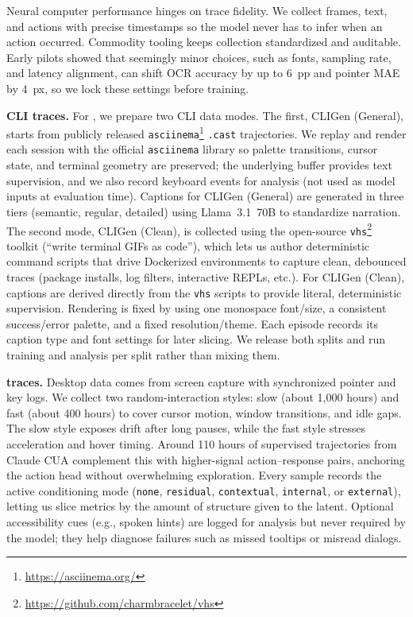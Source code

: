 Neural computer performance hinges on trace fidelity. We collect frames, text, and actions with precise timestamps so the model never has to infer when an action occurred. Commodity tooling keeps collection standardized and auditable. Early pilots showed that seemingly minor choices, such as fonts, sampling rate, and latency alignment, can shift OCR accuracy by up to 6~pp and pointer MAE by 4~px, so we lock these settings before training.

\noindent\textbf{CLI traces.}
For \nccligen{}, we prepare two CLI data modes. The first, CLIGen (General), starts from publicly released \texttt{asciinema}\footnote{\url{https://asciinema.org/}} \texttt{.cast} trajectories. We replay and render each session with the official \texttt{asciinema} library so palette transitions, cursor state, and terminal geometry are preserved; the underlying buffer provides text supervision, and we also record keyboard events for analysis (not used as model inputs at evaluation time). Captions for CLIGen (General) are generated in three tiers (semantic, regular, detailed) using Llama~3.1~70B to standardize narration. The second mode, CLIGen (Clean), is collected using the open-source \texttt{vhs}\footnote{\url{https://github.com/charmbracelet/vhs}} toolkit (``write terminal GIFs as code''), which lets us author deterministic command scripts that drive Dockerized environments to capture clean, debounced traces (package installs, log filters, interactive REPLs, etc.). For CLIGen (Clean), captions are derived directly from the \texttt{vhs} scripts to provide literal, deterministic supervision. Rendering is fixed by using one monospace font/size, a consistent success/error palette, and a fixed resolution/theme. Each episode records its caption type and font settings for later slicing. We release both splits and run training and analysis per split rather than mixing them.

\noindent\textbf{\ncguiworld{} traces.}
Desktop data comes from screen capture with synchronized pointer and key logs. We collect two random-interaction styles: slow (about 1{,}000 hours) and fast (about 400 hours) to cover cursor motion, window transitions, and idle gaps. The slow style exposes drift after long pauses, while the fast style stresses acceleration and hover timing. Around 110 hours of supervised trajectories from Claude CUA complement this with higher-signal action--response pairs, anchoring the action head without overwhelming exploration. Every sample records the active conditioning mode (\texttt{none}, \texttt{residual}, \texttt{contextual}, \texttt{internal}, or \texttt{external}), letting us slice metrics by the amount of structure given to the latent. Optional accessibility cues (e.g., spoken hints) are logged for analysis but never required by the model; they help diagnose failures such as missed tooltips or misread dialogs.

